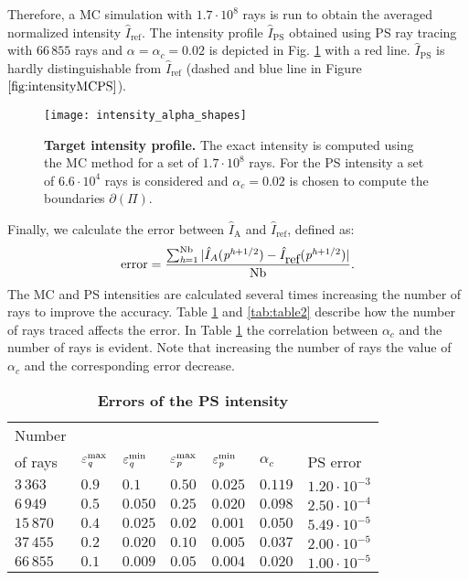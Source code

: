 Therefore, a MC simulation with $1.7 \cdot 10^8$ rays is run to obtain the averaged normalized intensity $\hat{I}_{\textrm{ref}}$.
The intensity profile $\hat{I}_{\textrm{PS}}
$ obtained using PS ray tracing with $66\,855$ rays and $\alpha= \alpha_c = 0.02$ is depicted in Fig. \ref{fig:intensityMCPS} with a red line.
$\hat{I}_{\textrm{PS}}$ is hardly distinguishable from $\hat{I}_{\textrm{ref}}$ (dashed and blue line in Figure $\ref{fig:intensityMCPS}$).\\ \indent
  \begin{figure}[h]
    \centering
    \texttt{[image: intensity\_alpha\_shapes]}
\caption{\textbf{Target intensity profile.}
The exact intensity is computed using the MC method for a set of $1.7\cdot10^8$ rays. For the PS intensity a set of $6.6\cdot 10^4$
rays is considered and $\alpha_c = 0.02$ is chosen to compute the boundaries $\partial$$(\Pi)$.}
  \label{fig:intensityMCPS}
\end{figure}
Finally, we calculate the error between $\hat{I}_{\textrm{A}}$ and $\hat{I}_{\textrm{ref}}$, defined as:
\begin{equation}\label{eq:error}
\mbox{error} = \frac{\sum_{\textit{h}= 1}^{\textrm{Nb}}| \hat{I}_{A}(\textit{p}^{\textit{h}+1/2}) - \hat{I}_{\mbox{ref}}(\textit{p}^{\textit{h}+1/2})|}{\textrm{Nb}}.
\end{equation}
The MC and PS intensities are calculated several times increasing the number of rays to improve the accuracy.
Table \ref{tab:table} and \ref{tab:table2} describe how the number of rays traced affects the error. 
In Table \ref{tab:table} the correlation between $\alpha_c$ and the number of rays is evident.
Note that increasing the number of rays the value of $\alpha_c$ and the corresponding error decrease. 
\begin{table}[htbp] \label{tab:table}
\centering
\caption{\bf Errors of the PS intensity}
\begin{tabular}{lllllll}
 \hline  Number \\ of rays\;  & $\varepsilon^{\textrm{max}}_{\textit{q}} $  & $\varepsilon^{\textrm{min}}_{\textit{q}} $   \;     & $\varepsilon^{\textrm{max}}_{\textit{p}}$\;
  & $\varepsilon^{\textrm{min}}_{\textit{p}}$\; & $\alpha_c$  & PS error \\
  \hline 
 $3\,363$ & $0.9$  & $0.1$  & $0.50$  & $0.025$ & $0.119$ & $1.20\cdot10^{-3}$ \\
$6\,949$  & $0.5$  & $0.050$  & $0.25$  & $0.020$ & $0.098$ & $2.50\cdot 10^{-4}$  \\
$15\,870$  & $0.4$  & $0.025$  & $0.02$  & $0.001$ & $0.050$ & $5.49\cdot 10^{-5}$ \\
 $37\,455$  & $0.2$  & $0.020$  & $0.10$ & $0.005$ & $0.037$ & $2.00\cdot 10^{-5}$ \\
 $66\,855$ & $0.1$  & $0.009$  & $0.05$  & $0.004$ & $0.020$ & $1.00\cdot 10^{-5}$ \\
 \hline
 \end{tabular}
 \label{tab:table}
 \end{table}
